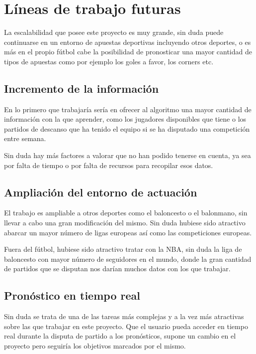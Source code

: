 \section{Líneas de trabajo futuras}
La escalabilidad que posee este proyecto es muy grande, sin duda puede continuarse en un entorno de apuestas deportivas incluyendo otros deportes, o es más en el propio fútbol cabe la posibilidad de pronosticar una mayor cantidad de tipos de apuestas como por ejemplo los goles a favor, los corners etc.

\subsection{Incremento de la información}
En lo primero que trabajaría sería en ofrecer al algoritmo una mayor cantidad de información con la que aprender, como los jugadores disponibles que tiene o los partidos de descanso que ha tenido el equipo si se ha disputado una competición entre semana. 

Sin duda hay más factores a valorar que no han podido tenerse en cuenta, ya sea por falta de tiempo o por falta de recursos para recopilar esos datos.

\subsection{Ampliación del entorno de actuación}
El trabajo es ampliable a otros deportes como el baloncesto o el balonmano, sin llevar a cabo una gran modificación del mismo. Sin duda hubiese sido atractivo abarcar un mayor número de ligas europeas así como las competiciones europeas.

Fuera del fútbol, hubiese sido atractivo tratar con la NBA, sin duda la liga de baloncesto con mayor número de seguidores en el mundo, donde la gran cantidad de partidos que se disputan nos darían muchos datos con los que trabajar.

\subsection{Pronóstico en tiempo real}
Sin duda se trata de una de las tareas más complejas y a la vez más atractivas sobre las que trabajar en este proyecto. Que el usuario pueda acceder en tiempo real durante la disputa de partido a los pronósticos, supone un cambio en el proyecto pero seguiría los objetivos marcados por el mismo.